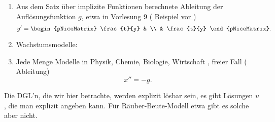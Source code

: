 \begin{beispiele*}
  \begin{enumerate}
    \item Aus dem Satz über implizite Funktionen berechnete Ableitung der Auflösungsfunktion \( g \), etwa in Vorlesung 9 (\hyperref[implizite_funktion_beispiel_fuer_dgls]{ Beispiel vor })
    \begin{equation*}
      y'=\begin{pNiceMatrix} \frac{t}{y} &  \\  & \frac{t}{y} \end{pNiceMatrix}.
    \end{equation*}
    \item Wachstumsmodelle:
    \item Jede Menge Modelle in Physik, Chemie, Biologie, Wirtschaft \etc, \zb freier Fall ( Ableitung)
    \begin{equation*}
      x''=-g.
    \end{equation*}
  \end{enumerate}
  Die DGL'n, die wir hier betrachte, werden explizit lösbar sein, \dh es gibt Lösungen \( u \), die man explizit angeben kann. Für Räuber-Beute-Modell etwa gibt es solche aber \ia nicht.
\end{beispiele*}
